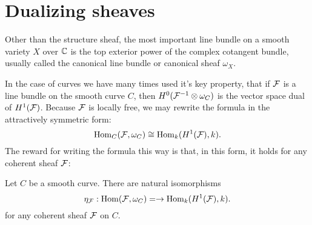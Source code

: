 %




\section {Dualizing sheaves} 

\def\HH{{H}}

Other than  the structure sheaf, the most important line bundle on a smooth variety   $X$ over $\CC$ is the top exterior power of the complex cotangent bundle, usually called the canonical line bundle or canonical sheaf $\omega_{X}$. 

In the case of curves  we have many times used it's key property, that if  $\cF$  is a line bundle on the smooth curve  $C$, then $\HH^{0}(\sF^{-1}\otimes \omega_{C})$ is the vector space dual of $\HH^{1}(\cF)$. Because $\sF$ is locally free, we may rewrite the formula in the attractively symmetric form:
$$
\Hom_{C}(\sF, \omega_{C})
\cong 
\Hom_{k}(\HH^{1}(\cF), k).
$$
The reward for writing the formula this way is that, in this form, 
it holds for any coherent sheaf $\cF$:

\begin{proposition} Let $C$ be a smooth curve.
There are natural isomorphisms
$$
\eta_{\sF}: \Hom(\sF,\omega_{C}) =  
\to 
\Hom_{k}(\HH^{1}(\cF), k).
$$
for any coherent sheaf $\cF$ on $C$.
\end{proposition}

